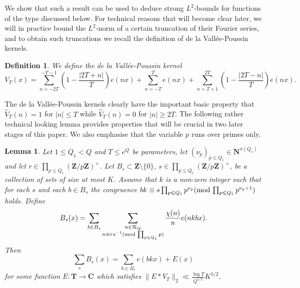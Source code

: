 \documentclass[11pt, reqno]{amsart}
\newtheorem{lemma}[theorem]{Lemma}
\newtheorem{definition}[theorem]{Definition}
\newcommand{\mdlem}[1]{\ensuremath{(\mbox{\textup{mod}}\, #1)}}
\newcommand{\mdsublem}[1]{\ensuremath{(\mbox{\scriptsize \textup{mod}}\, #1)}}
\begin{document}
We show that such a result can be used to deduce strong $L^2$-bounds for functions of the type discussed below. For technical reasons that will become clear later, we will in practice bound the $L^2$-norm of a certain truncation of their Fourier series, and to obtain such truncations we recall the definition of de la Vall\'ee-Poussin kernels.
    \begin{definition}
        \normalfont We define the \emph{de la Vall\'ee-Poussin kernel}
$$V_{T}(x)=\sum_{n=-2T}^{-T-1}\left(1-\frac{|2T+n|}{T}\right)e(nx)+\sum_{n=-T}^Te(nx)+\sum_{n=T+1}^{2T}\left(1-\frac{|2T-n|}{T}\right)e(nx).$$ 
    \end{definition}
The de la Vall\'ee-Poussin kernels clearly have the important basic property that $\hat{V}_{T}(n)=1$ for $|n|\leqslant T$ while $\hat{V}_{T}(n)=0$ for $|n|\geqslant 2T$.
The following rather technical looking lemma provides properties that will be crucial in two later stages of this paper. We also emphasise that the variable $p$ runs over primes only.
\begin{lemma}\label{lem:generalcont}
    Let $1\leqslant Q_1<Q$ and $T\leqslant e^{Q}$ be parameters, let $(\nu_p)_{p\leqslant Q_1}\in\mathbf{N}^{\pi(Q_1)}$ and let $r\in \prod_{p\leqslant Q_1}(\mathbf{Z}/p\mathbf{Z})^\times$. Let $B_s\subset \mathbf{Z}\setminus\{0\}$, $s\in\prod_{p\leqslant Q_1}(\mathbf{Z}/p\mathbf{Z})^\times$, be a collection of sets of size at most $K$. Assume that $k$ is a non-zero integer such that for each $s$ and each $b\in B_s$ the congruence $bk\equiv s\prod_{p\leqslant Q_1}p^{\nu_p}\mdlem{\prod_{p\leqslant Q_1}p^{\nu_p+1}}$ holds. Define
    $$B_s(x)=\sum_{b\in B_s}\sum_{\substack{n\in\mathcal{R}_Q\\ n\equiv rs^{-1}\mdsublem{\prod_{p\leqslant Q_1} p}}}\frac{\chi(n)}{n}e(nkbx).$$
    Then
    $$\sum_sB_s(x)=\sum_{b\in B_r}e(bkx)+E(x)$$
        for some function $E:\mathbf{T}\to\mathbf{C}$ which satisfies $\lVert E*V_{T}\rVert_2\ll \frac{\log T}{Q^{1/2}}K^{1/2}$.
\end{lemma}
\end{document}
